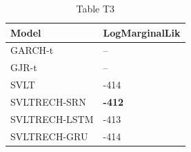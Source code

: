 \begin{table}[htbp]
\centering
\caption{Table T3}
\label{tab:T3}
\begin{tabular}{ll}
\toprule
Model & LogMarginalLik \\
\midrule
GARCH-t & -- \\
GJR-t & -- \\
SVLT & -414 \\
SVLTRECH-SRN & \textbf{-412} \\
SVLTRECH-LSTM & -413 \\
SVLTRECH-GRU & -414 \\
\bottomrule
\end{tabular}
\end{table}